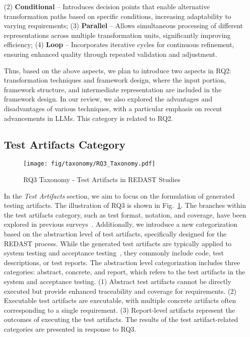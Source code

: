 \begin{itemize}
    (2) \textbf{Conditional} – Introduces decision points that enable alternative transformation paths based on specific conditions, increasing adaptability to varying requirements;
    (3) \textbf{Parallel} – Allows simultaneous processing of different representations across multiple transformation units, significantly improving efficiency;
    (4) \textbf{Loop} – Incorporates iterative cycles for continuous refinement, ensuring enhanced quality through repeated validation and adjustment.
\end{itemize}
Thus, based on the above aspects, we plan to introduce two aspects in RQ2: transformation techniques and framework design, where the input portion, framework structure, and intermediate representation are included in the framework design. In our review, we also explored the advantages and disadvantages of various techniques, with a particular emphasis on recent advancements in LLMs. This category is related to RQ2.

\subsection{Test Artifacts Category}
\begin{figure}[!t]
    \centering
    \texttt{[image: fig/taxonomy/RQ3\_Taxonomy.pdf]}
    \caption{RQ3 Taxonomy - Test Artifacts in REDAST Studies}
    \label{fig:RQ3_taxonomy}
\end{figure}
In the \textit{Test Artifacts} section, we aim to focus on the formulation of generated testing artifacts. The illustration of RQ3 is shown in Fig.~\ref{fig:RQ3_taxonomy}. The branches within the test artifacts category, such as test format, notation, and coverage, have been explored in previous surveys~\cite{test_taxonomy_01, test_taxonomy_02, test_taxonomy_03}. Additionally, we introduce a new categorization based on the abstraction level of test artifacts, specifically designed for the REDAST process. While the generated test artifacts are typically applied to system testing and acceptance testing~\cite{test_standard}, they commonly include code, test descriptions, or test reports. The abstraction level categorization includes three categories: abstract, concrete, and report, which refers to the test artifacts in the system and acceptance testing. (1) Abstract test artifacts cannot be directly executed but provide enhanced traceability and coverage for requirements. (2) Executable test artifacts are executable, with multiple concrete artifacts often corresponding to a single requirement. (3) Report-level artifacts represent the outcomes of executing the test artifacts. The results of the test artifact-related categories are presented in response to RQ3.

